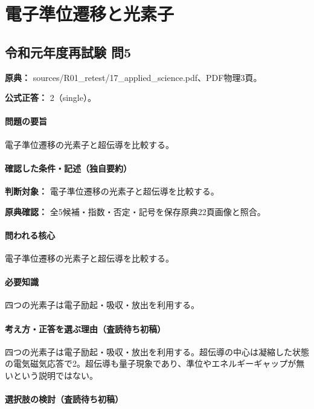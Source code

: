 \section{電子準位遷移と光素子}

\subsection{令和元年度再試験 問5}
\label{q:r01-ret-applied-05}

\noindent\textbf{原典：} sources/R01\_retest/17\_applied\_science.pdf、PDF物理3頁。

\textbf{公式正答：} 2（single）。

\paragraph{問題の要旨} 電子準位遷移の光素子と超伝導を比較する。

\paragraph{確認した条件・記述（独自要約）}\mbox{}\par

\noindent\textbf{判断対象：} 電子準位遷移の光素子と超伝導を比較する。\par

\noindent\textbf{原典確認：} 全5候補・指数・否定・記号を保存原典22頁画像と照合。\par

\paragraph{問われる核心} 電子準位遷移の光素子と超伝導を比較する。

\paragraph{必要知識} 四つの光素子は電子励起・吸収・放出を利用する。

\paragraph{考え方・正答を選ぶ理由（査読待ち初稿）} 四つの光素子は電子励起・吸収・放出を利用する。超伝導の中心は凝縮した状態の電気磁気応答で2。超伝導も量子現象であり、準位やエネルギーギャップが無いという説明ではない。

\paragraph{選択肢の検討（査読待ち初稿）}\mbox{}\par

